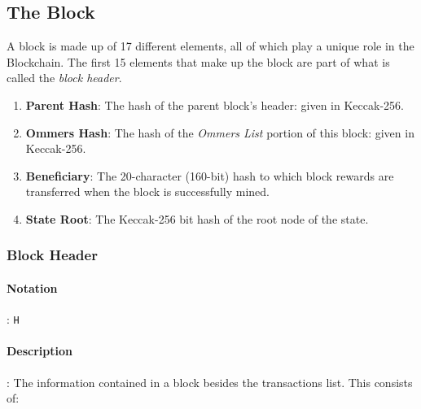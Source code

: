 \documentclass[10pt,a4paper,leqno,bibliography=totoc]{scrartcl}
\newenvironment{alphafootnotes}
{\par\edef\savedfootnotenumber{\number\value{footnote}}
\renewcommand{\thefootnote}{\alph{footnote}}
\setcounter{footnote}{0}}
{\par\setcounter{footnote}{\savedfootnotenumber}}
\begin{document}
\begin{alphafootnotes}
\begin{multicols*}{2}
		\subsection{The Block}
			A block is made up of 17 different elements, all of which play a unique role in the Blockchain. The first 15 elements that make up the block are part of what is called the \textsl{block header}. 

			\begin{enumerate}
				\item \textbf{Parent Hash}: The hash of the parent block's header: given in Keccak-256.
				\item \textbf{Ommers Hash}: The hash of the \textsl{Ommers List} portion of this block: given in Keccak-256.
				\item \textbf{Beneficiary}: The 20-character (160-bit) hash to which block rewards are transferred when the block is successfully mined.
				\item \textbf{State Root}: The Keccak-256 bit hash of the root node of the state. 
			
			\end{enumerate}
				\subsubsection{Block Header}
				\paragraph{Notation}: \texttt{H} 
				\paragraph{Description}: The information contained in a block besides the transactions list. This consists of:


\end{multicols*}
\end{alphafootnotes}
\end{document}
